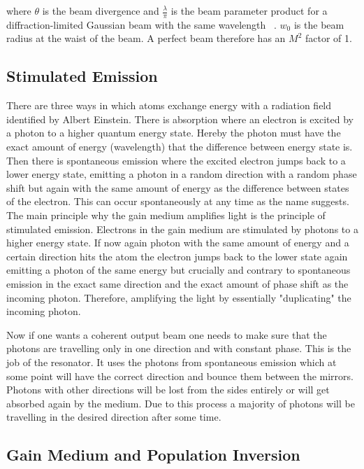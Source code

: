 \documentclass[a4paper,10pt]{article}
\begin{document}
    where $\theta$ is the beam divergence and $\frac{\lambda}{\pi}$ is
    the beam parameter product for a diffraction-limited Gaussian beam
    with the same wavelength ~\cite{m2_rpphotonics}.
    $w_0$ is the beam radius at the waist of the beam.
    A perfect beam therefore has an $M^2$ factor of 1.

    \subsection{Stimulated Emission}

    There are three ways in which atoms exchange energy with a radiation
    field~\cite{lasers_liverpool} identified by Albert Einstein.
    There is absorption where an electron is excited by a photon to a higher
    quantum energy state.
    Hereby the photon must have the exact amount of energy (wavelength)
    that the difference between energy state is.
    Then there is spontaneous emission where the excited electron jumps
    back to a lower energy state, emitting a photon in a random direction
    with a random phase shift
    but again with the same amount of energy as the difference between 
    states of the electron.
    This can occur spontaneously at any time as the name suggests. 
    The main principle why the gain medium amplifies light is the principle
    of stimulated emission.
    Electrons in the gain medium are stimulated by photons to a higher
    energy state.
    If now again photon with the same amount of energy and a certain
    direction hits the atom the electron jumps back to the lower state
    again emitting a photon of the same energy but crucially and contrary
    to spontaneous emission in the exact same direction and the exact
    amount of phase shift as the incoming photon.
    Therefore, amplifying the light by essentially "duplicating" the incoming
    photon.

    Now if one wants a coherent output beam one needs to make sure that
    the photons are travelling only in one direction and with constant
    phase.
    This is the job of the resonator.
    It uses the photons from spontaneous emission which at some point
    will have the correct direction and bounce them between the mirrors.
    Photons with other directions will be lost from the sides entirely
    or will get absorbed again by the medium.
    Due to this process a majority of photons will be travelling in the
    desired direction after some time.

    \subsection{Gain Medium and Population Inversion}
\end{document}
